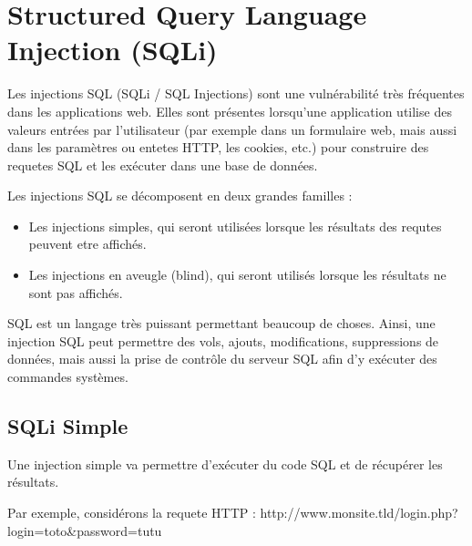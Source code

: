 

\newpage
\section{Structured Query Language Injection (SQLi)}\label{vulnerabilites:web:sqli}

Les injections SQL (SQLi / SQL Injections) sont une vulnérabilité très fréquentes dans les applications web. Elles sont présentes lorsqu'une application utilise des valeurs entrées par l'utilisateur (par exemple dans un formulaire web, mais aussi dans les paramètres ou entetes HTTP, les cookies, etc.) pour construire des requetes SQL et les exécuter dans une base de données.

\begin{tabbing}
\end{tabbing}
Les injections SQL se décomposent en deux grandes familles :
\begin{itemize}
\item Les injections simples, qui seront utilisées lorsque les résultats des requtes peuvent etre affichés.
\item Les injections en aveugle (blind), qui seront utilisés lorsque les résultats ne sont pas affichés.
\end{itemize}


\begin{tabbing}
\end{tabbing}
SQL est un langage très puissant permettant beaucoup de choses. Ainsi, une injection SQL peut permettre des vols, ajouts, modifications, suppressions de données, mais aussi la prise de contrôle du serveur SQL afin d'y exécuter des commandes systèmes.


\subsection{SQLi Simple}\label{vulnerabilites:web:sqli:simple}

Une injection simple va permettre d'exécuter du code SQL et de récupérer les résultats.

Par exemple, considérons la requete HTTP :
http://www.monsite.tld/login.php?login=toto\&password=tutu

